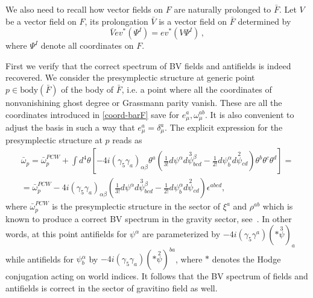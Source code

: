 \documentclass[a4paper,12pt]{article}
\numberwithin{equation}{section} %
\newcommand{\st}[2]{{\overset{#1}{#2}}}
\numberwithin{equation}{section}
\newcommand{\atheta}{\theta}
\begin{document}
We also need to recall how vector fields on $F$ are naturally prolonged to $\bar F$.  Let $V$ be a vector field on $F$, its prolongation $\bar V$ is a vector field on $\bar F$ determined by
\begin{equation}
\bar V ev^*(\Psi^I)=ev^*(V\Psi^I)\,,
\end{equation}
where $\Psi^I$ denote all coordinates on $F$.



First we verify that the correct spectrum of BV fields and antifields is indeed recovered.  We consider the presymplectic structure at  generic point  $p\in \mathrm{body}(\bar F)$ of the body of $\bar F$, i.e. a point where all the coordinates of nonvanishining ghost degree or Grassmann parity vanish. These are all the coordinates introduced in \eqref{coord-barF} save for $e^a_\mu,\omega_\mu^{ab}$. It is also convenient to adjust the  basis in such a way that $e^a_\mu=\delta^a_\mu$. The explicit expression for the presymplectic structure
at $p$ reads as
\begin{multline}\label{Sugra-presymplectic-form-body}
    \bar\omega_p = \bar\omega_p^{PCW} + \int d^4\atheta \left[-4i(\gamma_5\gamma_a)_{\alpha\beta}\atheta^a \left(\frac{1}{3!}d\psi^\alpha d\st{3}{\psi}{}^\beta_{bcd} - \frac{1}{2!}d\psi_b^\alpha  d\st{2}{\psi}{}_{cd} \right)\atheta^b \atheta^c\atheta^d\right]=\\
   = \bar\omega_p^{PCW} - 4i(\gamma_5\gamma_a)_{\alpha\beta}\left(\frac{1}{3!}d\psi^\alpha d\st{3}{\psi}{}^\beta_{bcd} - \frac{1}{2!}d\psi_b^\alpha d\st{2}{\psi}{}_{cd} \right)\epsilon^{abcd},
\end{multline}
where $\bar\omega_p^{PCW}$ is the presymplectic structure in the sector of $\xi^a$ and $\rho^{ab}$ which is known to produce a correct BV spectrum in the gravity  sector, see~\cite{Grigoriev:2020xec}. In other words, at this point antifields for $\psi^\alpha$ are parameterized by $-4i(\gamma_5\gamma^a)(*\st{3}{\psi})_a$ while antifields for ${\psi}{}^\alpha_b$ by $-4i(\gamma_5\gamma_a)(*\st{2}{\psi})^{ba}$,
where $*$ denotes the Hodge conjugation acting on world indices. It follows that the BV spectrum of fields and antifields is correct in the sector of gravitino field as well.
\end{document}
